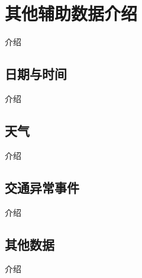 \documentclass{ctexart}
\begin{document}
\section{其他辅助数据介绍}
介绍

\subsection{日期与时间}
介绍

\subsection{天气}
介绍

\subsection{交通异常事件}
介绍

\subsection{其他数据}
介绍



\end{document}
